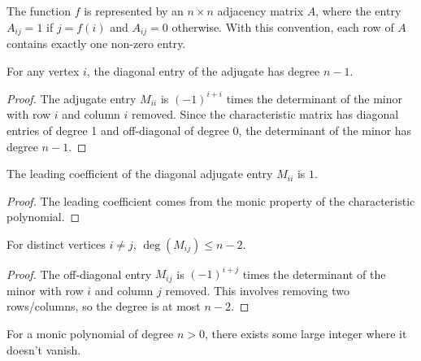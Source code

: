 \begin{definition}
\label{def:adjacencyMatrix}
\leanok
The function $f$ is represented by an $n \times n$ adjacency matrix $A$, where the entry $A_{ij} = 1$ if $j=f(i)$ and $A_{ij}=0$ otherwise. With this convention, each row of $A$ contains exactly one non-zero entry.
\end{definition}

\begin{lemma}
\label{lem:adjugate_diag_degree}
For any vertex $i$, the diagonal entry of the adjugate has degree $n-1$.
\end{lemma}

\begin{proof}
The adjugate entry $M_{ii}$ is $(-1)^{i+i}$ times the determinant of the minor with row $i$ and column $i$ removed.
Since the characteristic matrix has diagonal entries of degree 1 and off-diagonal of degree 0,
the determinant of the minor has degree $n-1$.
\end{proof}

\begin{lemma}
\label{lem:adjugate_diag_leading_coeff}
The leading coefficient of the diagonal adjugate entry $M_{ii}$ is $1$.
\end{lemma}

\begin{proof}
The leading coefficient comes from the monic property of the characteristic polynomial.
\end{proof}

\begin{lemma}
\label{lem:adjugate_offdiag_degree}
For distinct vertices $i \neq j$, $\deg(M_{ij}) \leq n-2$.
\end{lemma}

\begin{proof}
The off-diagonal entry $M_{ij}$ is $(-1)^{i+j}$ times the determinant of the minor with row $i$ and column $j$ removed.
This involves removing two rows/columns, so the degree is at most $n-2$.
\end{proof}

\begin{lemma}
\label{lem:exists_large_eval_nonzero}
For a monic polynomial of degree $n > 0$, there exists some large integer where it doesn't vanish.
\end{lemma}

